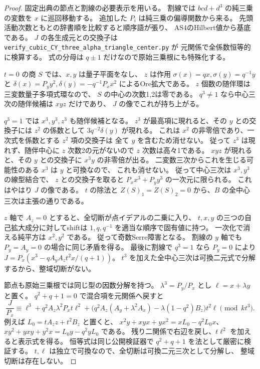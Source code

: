 \begin{proof}
固定出典\cite{AS4CYpinned}の節点と割線の必要表示を用いる。
割線では $bcd+d^3$ の純三乗の変数を $x$ に巡回移動する。
追加した $P_i$ は純三乗の偏導関数から来る。
先頭活動次数ともとの辞書順を比較すると順序語が張り、
AS4のHilbert値から基底である。
$J$ の各生成元との交換子は
\texttt{verify\_cubic\_CY\_three\_alpha\_triangle\_center.py} が
元関係で全係数恒等的に検算する。
式の分母は $q\pm1$ だけなので原始三乗根にも特殊化する。

$t=0$ の商 $S$ では、$x,y$ は量子平面をなし、
$z$ は作用 $\sigma(x)=qx,\sigma(y)=q^{-1}y$ と
$\delta(x)=P_y y^2,\delta(y)=-q^{-1}P_xx^2$ によるOre拡大である。
$z$ 個数の随伴環は三変数量子多項式環なので、
$S$ の中心の次数1,2は零である。
$q^3\ne1$ なら中心三次の随伴候補は $xyz$ だけであり、
$J$ の像でこれが持ち上がる。

$q^3=1$ では $x^3,y^3,z^3$ も随伴候補となる。
$z^3$ が最高項に現れると、その $y$ との交換子には
$z^2$ の係数として $3q^{-2}\delta(y)$ が現れる。
これは $x^2$ の非零倍であり、一次式を係数とする $z^2$ 項の交換子は
全て $y$ を含むため消せない。
従って $z^3$ は現れず、随伴中心に $z$ 次数2の元がないので $z$ 次数は高々1である。
$xyz$ が現れると、その $y$ との交換子に $x^3y$ の非零倍が出る。
二変数三次からこれを生じる可能性のある $x^3$ は $y$ と可換なので、
これも消せない。
従って中心三次は $x^3,y^3$ の線型結合で、
$z$ との交換子を取ると $P_xx^3+P_yy^3$ の一次元に限られる。
これはやはり $J$ の像である。
$t$ の除法と $Z(S)_1=Z(S)_2=0$ から、$B$ の全中心三次は主張の通りである。

$z$ 軸で $A_z=0$ とすると、全切断が点イデアルの二乗に入り、
$t,x,y$ の三つの自己拡大成分に対してshiftは
$1,q,q^{-1}$ を適当な順序で固有値に持つ。
一次化で消える純平方は $x^2,y^2$ である。
従って奇数Serre障害となる。
割線の $y$ 軸でも $P_y=A_y=0$ の場合に同じ矛盾を得る。
最後に割線で $q^3=1$ なら $P_y=0$ により
$J=P_x(x^3-q A_yA_z t^2x/(q+1))$。
$t^3$ を加えた全中心三次は可換二元式で分解するから、整域切断がない。

節点も原始三乗根では同じ型の因数分解を持つ。
$\lambda^3=P_y/P_x$ とし $\ell=x+\lambda y$ と置く。
$q^2+q+1=0$ で混合項を元関係へ戻すと
\[
 \frac{J}{P_x}\equiv
 \ell^3+q^2 A_z\lambda^2 P_x t\ell^2+
 \bigl(q^2 A_z(A_y+\lambda^2A_x)-\lambda(1-q^2)B_z\bigr)t^2\ell
 \pmod {kt^3}.
\]
例えば $L_0=tA_z z+t^2B_z$ と置くと、
$x^2y+xyx+yx^2=xL_0-q^2L_0x$、
$xy^2+yxy+y^2x=L_0y-q^2yL_0$ である。
残り二関係で右辺を戻し、$t\ell^2$ を加えると表示式を得る。
恒等式は同じ公開検証器で $q^2+q+1$ を法として厳密に検証する。
$t,\ell$ は独立で可換なので、全切断は可換二元三次として分解し、
整域切断は存在しない。
\end{proof}

